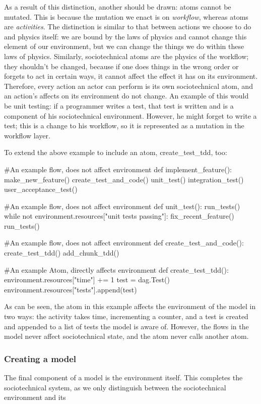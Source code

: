 As a result of this distinction, another should be drawn: atoms cannot be mutated. This is because the mutation we enact is on \emph{workflow}, whereas atoms are \emph{activities}. The distinction is similar to that between actions we choose to do and physics itself: we are bound by the laws of physics and cannot change this element of our environment, but we can change the things we do within these laws of physics. Similarly, sociotechnical atoms are the physics of the workflow; they shouldn't be changed, because if one does things in the wrong order or forgets to act in certain ways, it cannot affect the effect it has on its environment. Therefore, every action an actor can perform is its own sociotechnical atom, and an action's affects on its environment do not change. An example of this would be unit testing: if a programmer writes a test, that test is written and is a component of his sociotechnical environment. However, he might forget to write a test; this is a change to his workflow, so it is represented as a mutation in the workflow layer.  \par
To extend the above example to include an atom, create\_test\_tdd\(\), too:
\begin{pyglist}[language = python, encoding = utf8]
#An example flow, does not affect environment
def implement_feature():
    make_new_feature()
    create_test_and_code()
    unit_test()
    integration_test()
    user_acceptance_test()

#An example flow, does not affect environment
def unit_test():
    run_tests()
    while not environment.resources["unit tests passing"]:
        fix_recent_feature()
        run_tests()

#An example flow, does not affect environment
def create_test_and_code():
    create_test_tdd()
    add_chunk_tdd()
    
#An example Atom, directly affects environment
def create_test_tdd():
    environment.resources["time"] += 1
    test = dag.Test()
    environment.resources["tests"].append(test)

\end{pyglist}\par
As can be seen, the atom in this example affects the environment of the model in two ways: the activity takes time, incrementing a counter, and a test is created and appended to a list of tests the model is aware of. However, the flows in the model never affect sociotechnical state, and the atom never calls another atom. 

\subsubsection{Creating a model}
The final component of a model is the environment itself. This completes the sociotechnical system, as we only distinguish between the sociotechnical environment and its  \par

